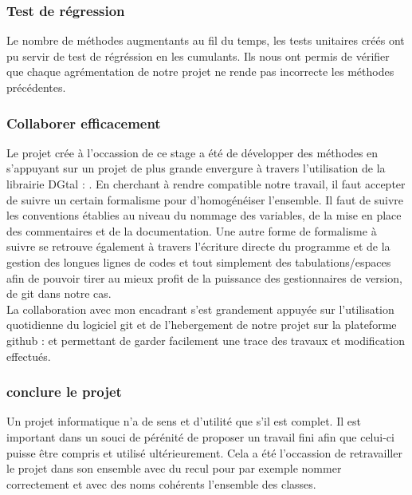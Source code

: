 \subsubsection{Test de régression}

Le nombre de méthodes augmentants au fil du temps, les tests unitaires créés ont pu servir de test de régréssion en les cumulants. Ils nous ont permis de vérifier que chaque agrémentation de notre projet ne rende pas incorrecte les méthodes précédentes.\\


\subsubsection{Collaborer efficacement}

Le projet crée à l'occassion de ce stage a été de développer des méthodes en s'appuyant sur un projet de plus grande envergure à travers l'utilisation de la librairie DGtal : \cite{DGtal}. En cherchant à rendre compatible notre travail, il faut accepter de suivre un certain formalisme pour d'homogénéiser l'ensemble. Il faut de suivre les conventions établies au niveau du nommage des variables, de la mise en place des commentaires et de la documentation. Une autre forme de formalisme à suivre se retrouve également à travers l'écriture directe du programme et de la gestion des longues lignes de codes et tout simplement des tabulations/espaces afin de pouvoir tirer au mieux profit de la puissance des gestionnaires de version, de git dans notre cas.\\

La collaboration avec mon encadrant s'est grandement appuyée sur l'utilisation quotidienne du logiciel git et de l'hebergement de notre projet sur la plateforme github : \cite{github-tristan} et \cite{github-thomas} permettant de garder facilement une trace des travaux et modification effectués.

\subsubsection{conclure le projet}

Un projet informatique n'a de sens et d'utilité que s'il est complet. Il est important dans un souci de pérénité de proposer un travail fini afin que celui-ci puisse être compris et utilisé ultérieurement. Cela a été l'occassion de retravailler le projet dans son ensemble avec du recul pour par exemple nommer correctement et avec des noms cohérents l'ensemble des classes.





